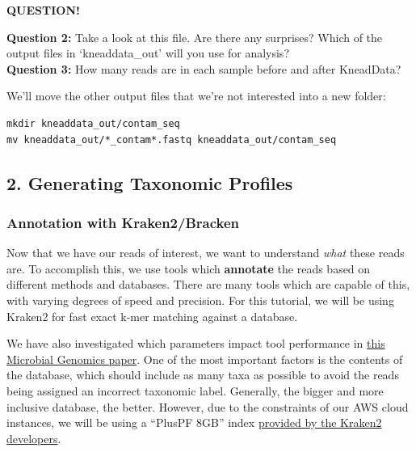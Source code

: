 \documentclass[
]{book}
\newenvironment{bluebox}{
  \definecolor{shadecolor}{RGB}{172, 210, 237}
  \color{white}
  \begin{shaded}}
 {\end{shaded}}
\begin{document}
\begin{bluebox}

\begin{center}
\textbf{QUESTION!}

\end{center}

\textbf{Question 2:} Take a look at this file. Are there any surprises? Which of the output files in `kneaddata\_out' will you use for analysis?\\
\textbf{Question 3:} How many reads are in each sample before and after KneadData?

\end{bluebox}

We'll move the other output files that we're not interested into a new folder:

\begin{verbatim}
mkdir kneaddata_out/contam_seq
mv kneaddata_out/*_contam*.fastq kneaddata_out/contam_seq
\end{verbatim}

\subsection{2. Generating Taxonomic Profiles}\label{generating-taxonomic-profiles}

\subsubsection{Annotation with Kraken2/Bracken}\label{annotation-with-kraken2bracken}

Now that we have our reads of interest, we want to understand \emph{what} these reads are. To accomplish this, we use tools which \textbf{annotate} the reads based on different methods and databases. There are many tools which are capable of this, with varying degrees of speed and precision. For this tutorial, we will be using Kraken2 for fast exact k-mer matching against a database.

We have also investigated which parameters impact tool performance in \href{https://pubmed.ncbi.nlm.nih.gov/36867161/}{this Microbial Genomics paper}. One of the most important factors is the contents of the database, which should include as many taxa as possible to avoid the reads being assigned an incorrect taxonomic label. Generally, the bigger and more inclusive database, the better. However, due to the constraints of our AWS cloud instances, we will be using a ``PlusPF 8GB'' index \href{https://benlangmead.github.io/aws-indexes/k2}{provided by the Kraken2 developers}.
\end{document}
